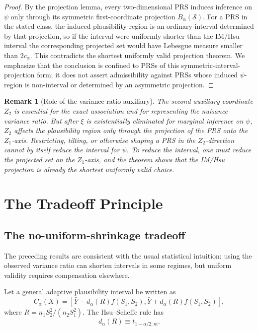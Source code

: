 \documentclass[12pt]{article}
\newtheorem{remark}{Remark}
\begin{document}
\begin{proof}
By the projection lemma, every two-dimensional PRS induces inference on
\(\psi\) only through its symmetric first-coordinate projection
\(B_\alpha(\mathcal S)\).  For a PRS in the stated class, the induced
plausibility region is an ordinary interval determined by that projection, so
if the interval were uniformly shorter than the IM/Hsu interval the
corresponding projected set would have Lebesgue measure smaller than
\(2c_\alpha\).  This contradicts the shortest uniformly valid projection
theorem.  We emphasize that the conclusion is confined to PRSs of this
symmetric-interval-projection form; it does not assert admissibility against
PRSs whose induced \(\psi\)-region is non-interval or determined by an
asymmetric projection.
\end{proof}

\begin{remark}[Role of the variance-ratio auxiliary]
The second auxiliary coordinate \(Z_2\) is essential for the exact association
and for representing the nuisance variance ratio.  But after \(\xi\) is
existentially eliminated for marginal inference on \(\psi\), \(Z_2\) affects
the plausibility region only through the projection of the PRS onto the
\(Z_1\)-axis.  Restricting, tilting, or otherwise shaping a PRS in the
\(Z_2\)-direction cannot by itself reduce the interval for \(\psi\).  To
reduce the interval, one must reduce the projected set on the \(Z_1\)-axis,
and the theorem shows that the IM/Hsu projection is already the
shortest uniformly valid choice.
\end{remark}

\section{The Tradeoff Principle}
\label{sec:tradeoff}

\subsection{The no-uniform-shrinkage tradeoff}

The preceding results are consistent with the usual statistical intuition:
using the observed variance ratio can shorten intervals in some regimes, but
uniform validity requires compensation elsewhere.

Let a general adaptive plausibility interval be written as
\[
C_\alpha(X)
=
\left[
\bar Y-d_\alpha(R)f(S_1,S_2),
\bar Y+d_\alpha(R)f(S_1,S_2)
\right],
\]
where \(R=n_1S_2^2/(n_2S_1^2)\).  The Hsu--Scheffe rule has
\[
d_\alpha(R)\equiv t_{1-\alpha/2,m}.
\]
\end{document}
